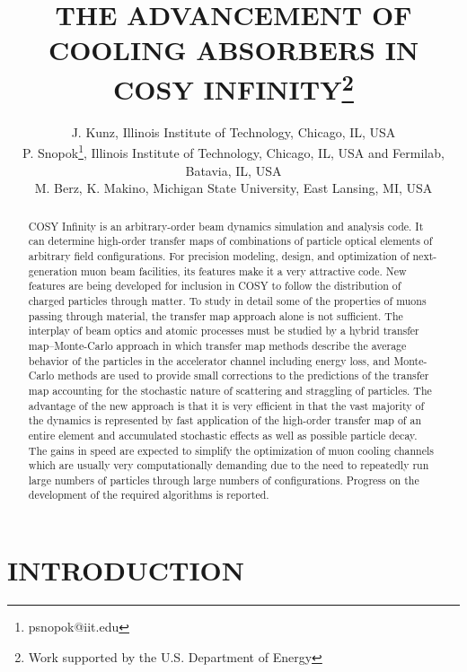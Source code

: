 \documentclass{jacow}
\begin{document}
\title{THE ADVANCEMENT OF COOLING ABSORBERS IN COSY INFINITY\thanks{Work supported by the U.S. Department of Energy}}

\author{J. Kunz, Illinois Institute of Technology, Chicago, IL, USA \\
P. Snopok\thanks{psnopok@iit.edu}, Illinois Institute of Technology, Chicago, IL, USA and Fermilab, Batavia, IL, USA \\
M. Berz, K. Makino, Michigan State University, East Lansing, MI, USA}

\maketitle

\begin{abstract}
COSY Infinity is an arbitrary-order beam dynamics simulation and analysis code. It can determine high-order transfer maps of combinations of particle optical elements of arbitrary field configurations. For precision modeling, design, and optimization of next-generation muon beam facilities, its features make it a very attractive code. New features are being developed for inclusion in COSY to follow the distribution of charged particles through matter. To study in detail some of the properties of muons passing through material, the transfer map approach alone is not sufficient. The interplay of beam optics and atomic processes must be studied by a hybrid transfer map--Monte-Carlo approach in which transfer map methods describe the average behavior of the particles in the accelerator channel including energy loss, and Monte-Carlo methods are used to provide small corrections to the predictions of the transfer map accounting for the stochastic nature of scattering and straggling of particles. The advantage of the new approach is that it is very efficient in that the vast majority of the dynamics is represented by fast application of the high-order transfer map of an entire element and accumulated stochastic effects as well as possible particle decay. The gains in speed are expected to simplify the optimization of muon cooling channels which are usually very computationally demanding due to the need to repeatedly run large numbers of particles through large numbers of configurations. Progress on the development of the required algorithms is reported.
\end{abstract}

\section{INTRODUCTION}
\end{document}
